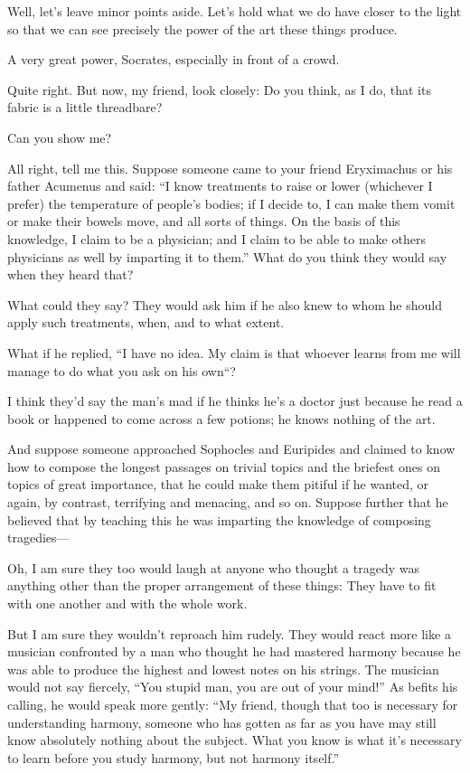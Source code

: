 \saysocrates Well, let’s leave minor points aside. Let’s
hold what we do have closer to the light so that we can see precisely
the power of the art these things produce.

\sayphaedrus A very great power, Socrates, especially in front of a crowd.

\saysocrates Quite right. But now, my friend, look closely: Do you think,
as I do, that its fabric is a little threadbare?

\sayphaedrus Can you show me?

\saysocrates All right, tell me this. Suppose someone came to your friend
Eryximachus or his father Acumenus and said: “I know treatments to raise
or lower (whichever I prefer) the temperature of people’s bodies; if I
decide to, I can make them vomit or make their bowels move, and
all sorts of things. On the basis of this knowledge, I claim to be a
physician; and I claim to be able to make others physicians as well by
imparting it to them.” What do you think they would say when they heard
that?

\sayphaedrus What could they say? They would ask him if he also knew to
whom he should apply such treatments, when, and to what extent.

\saysocrates What if he replied, “I have no idea. My claim is that whoever
learns from me will manage to do what you ask on his own“?

\sayphaedrus I think they’d say the man’s mad if he thinks he’s a doctor
just because he read a book or happened to come across a few potions; he
knows nothing of the art.

\saysocrates And suppose someone approached Sophocles and Euripides and
claimed to know how to compose the longest passages on trivial topics
and the briefest ones on topics of great importance, that he could make
them pitiful if he wanted, or again, by contrast, terrifying and
menacing, and so on. Suppose further that he believed that by
teaching this he was imparting the knowledge of composing tragedies---

\sayphaedrus Oh, I am sure they too would laugh at anyone who thought a
tragedy was anything other than the proper arrangement of these things:
They have to fit with one another and with the whole work.

\saysocrates But I am sure they wouldn’t reproach him rudely. They would
react more like a musician confronted by a man who thought he had
mastered harmony because he was able to produce the highest and lowest 
notes on his strings. The musician would not say fiercely, “You
stupid man, you are out of your mind!” As befits his calling, he would
speak more gently: “My friend, though that too is necessary for
understanding harmony, someone who has gotten as far as you have may
still know absolutely nothing about the subject. What you know is what
it’s necessary to learn before you study harmony, but not harmony
itself.”

